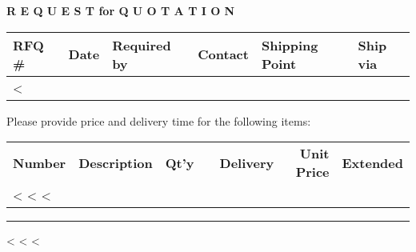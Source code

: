 \documentclass[twoside]{scrartcl}
\begin{document}
\vspace{1cm}

\textbf{R E Q U E S T for Q U O T A T I O N}
\hfill

\vspace{1cm}

\begin{tabularx}{\textwidth}{*{6}{|X}|} \hline
  \textbf{RFQ \#} & \textbf{Date} & \textbf{Required by} & \textbf{Contact} & \textbf{Shipping Point} & \textbf{Ship via} \\ [0.5ex]
  \hline
  <%
  \hline
\end{tabularx}

\vspace{1cm}

Please provide price and delivery time for the following items:

\vspace{1cm}

\begin{tabular*}{\textwidth}{@{}lp{\descrwidth}@{\extracolsep\fill}rllrr@{}}
  \textbf{Number} & \textbf{Description} & \textbf{Qt'y} & &
  \textbf{Delivery} & \textbf{Unit Price} & \textbf{Extended} \\
<%
  <%
<%
\end{tabular*}


\parbox{\textwidth}{
\rule{\textwidth}{2pt}

\hfill

<%
  <%
<%

}
\end{document}

